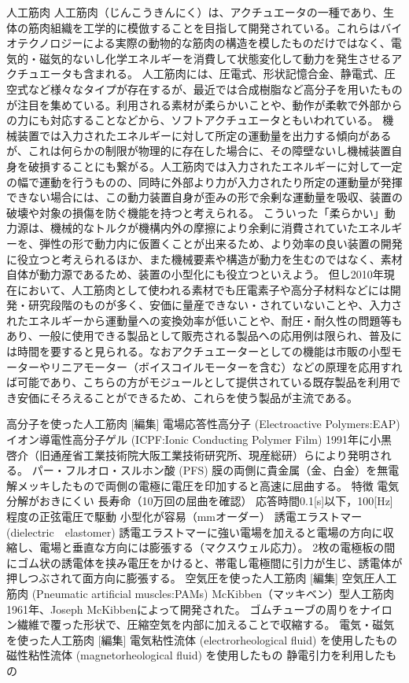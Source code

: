 人工筋肉
人工筋肉（じんこうきんにく）は、アクチュエータの一種であり、生体の筋肉組織を工学的に模倣することを目指して開発されている。これらはバイオテクノロジーによる実際の動物的な筋肉の構造を模したものだけではなく、電気的・磁気的ないし化学エネルギーを消費して状態変化して動力を発生させるアクチュエータも含まれる。
人工筋肉には、圧電式、形状記憶合金、静電式、圧空式など様々なタイプが存在するが、最近では合成樹脂など高分子を用いたものが注目を集めている。利用される素材が柔らかいことや、動作が柔軟で外部からの力にも対応することなどから、ソフトアクチュエータともいわれている。
機械装置では入力されたエネルギーに対して所定の運動量を出力する傾向があるが、これは何らかの制限が物理的に存在した場合に、その障壁ないし機械装置自身を破損することにも繋がる。人工筋肉では入力されたエネルギーに対して一定の幅で運動を行うものの、同時に外部より力が入力されたり所定の運動量が発揮できない場合には、この動力装置自身が歪みの形で余剰な運動量を吸収、装置の破壊や対象の損傷を防ぐ機能を持つと考えられる。
こういった「柔らかい」動力源は、機械的なトルクが機構内外の摩擦により余剰に消費されていたエネルギーを、弾性の形で動力内に仮置くことが出来るため、より効率の良い装置の開発に役立つと考えられるほか、また機械要素や構造が動力を生むのではなく、素材自体が動力源であるため、装置の小型化にも役立つといえよう。
但し2010年現在において、人工筋肉として使われる素材でも圧電素子や高分子材料などには開発・研究段階のものが多く、安価に量産できない・されていないことや、入力されたエネルギーから運動量への変換効率が低いことや、耐圧・耐久性の問題等もあり、一般に使用できる製品として販売される製品への応用例は限られ、普及には時間を要すると見られる。なおアクチュエーターとしての機能は市販の小型モーターやリニアモーター（ボイスコイルモーターを含む）などの原理を応用すれば可能であり、こちらの方がモジュールとして提供されている既存製品を利用でき安価にそろえることができるため、これらを使う製品が主流である。

高分子を使った人工筋肉 [編集]
電場応答性高分子 (Electroactive Polymers:EAP)
イオン導電性高分子ゲル (ICPF:Ionic Conducting Polymer Film)
1991年に小黒啓介（旧通産省工業技術院大阪工業技術研究所、現産総研）らにより発明される。
パー・フルオロ・スルホン酸 (PFS) 膜の両側に貴金属（金、白金）を無電解メッキしたもので両側の電極に電圧を印加すると高速に屈曲する。
特徴 
電気分解がおきにくい
長寿命（10万回の屈曲を確認）
応答時間0.1[s]以下，100[Hz]程度の正弦電圧で駆動
小型化が容易（mmオーダー）
誘電エラストマー (dielectric　elastomer)
誘電エラストマーに強い電場を加えると電場の方向に収縮し、電場と垂直な方向には膨張する（マクスウェル応力）。
2枚の電極板の間にゴム状の誘電体を挟み電圧をかけると、帯電し電極間に引力が生じ、誘電体が押しつぶされて面方向に膨張する。
空気圧を使った人工筋肉 [編集]
空気圧人工筋肉 (Pneumatic artificial muscles:PAMs)
McKibben（マッキベン）型人工筋肉
1961年、Joseph McKibbenによって開発された。
ゴムチューブの周りをナイロン繊維で覆った形状で、圧縮空気を内部に加えることで収縮する。
電気・磁気を使った人工筋肉 [編集]
電気粘性流体 (electrorheological fluid) を使用したもの
磁性粘性流体 (magnetorheological fluid) を使用したもの
静電引力を利用したもの

